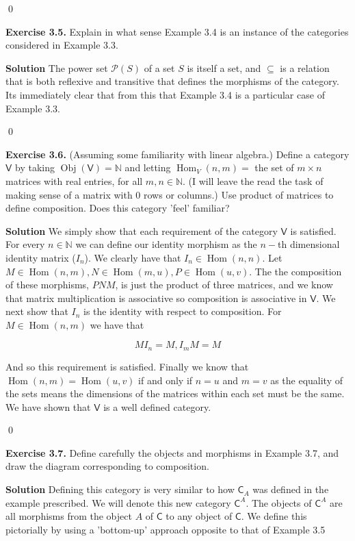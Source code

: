 \documentclass[titlepage]{article}
\newcommand{\Exercise}[1]{\textbf{Exercise #1}}
\newcommand{\Solution}{\textbf{Solution }}
\newcommand{\cat}[1]{\mathsf{#1}}
\newcommand{\Cat}{\cat{C}}
\DeclareMathOperator{\Hom}{Hom}
\DeclareMathOperator{\Obj}{Obj}
\begin{document}
\qed

\Exercise{3.5.} Explain in what sense Example 3.4 is an instance of the categories considered in Example 3.3.

\Solution The power set $\mathscr{P}(S)$ of a set $S$ is itself a set, and $\subseteq$ is a relation that is both reflexive and transitive that defines the morphisms of the category. Its immediately clear that from this that Example 3.4 is a particular case of Example 3.3. 

\qed

\Exercise{3.6.} (Assuming some familiarity with linear algebra.) Define a category $\cat{V}$ by taking $\Obj(\cat{V}) = \mathbb{N}$ and letting $\Hom_V(n,m) = $ the set of $m \times n$ matrices with real entries, for all $m,n \in \mathbb{N}$. (I will leave the read the task of making sense of a matrix with 0 rows or columns.) Use product of matrices to define composition. Does this category 'feel' familiar?

\Solution We simply show that each requirement of the category $\cat{V}$ is satisfied. For every $n \in \mathbb{N}$ we can define our identity morphism as the $n-$th dimensional identity matrix ($I_n$). We clearly have that $I_n \in \Hom(n,n)$. Let $M \in \Hom(n,m), N \in \Hom(m,u), P \in \Hom(u,v)$. The the composition of these morphisms, $PNM$, is just the product of three matrices, and we know that matrix multiplication is associative so composition is associative in $\cat{V}$. We next show that $I_n$ is the identity with respect to composition. For $M \in \Hom(n,m)$ we have that

\[ M I_n = M, I_m M = M \]

And so this requirement is satisfied. Finally we know that $\Hom(n,m) = \Hom(u,v)$ if and only if $n=u$ and $m=v$ as the equality of the sets means the dimensions of the matrices within each set must be the same. We have shown that $\cat{V}$ is a well defined category.

\qed

\Exercise{3.7.} Define carefully the objects and morphisms in Example 3.7, and draw the diagram corresponding to composition.

\medskip

\Solution Defining this category is very similar to how $\Cat_A$ was defined in the example prescribed. We will denote this new category $\Cat^A$. The objects of $\Cat^A$ are all morphisms from the object $A$ of $\Cat$ to any object of $\Cat$. We define this pictorially by using a 'bottom-up' approach opposite to that of Example 3.5
\end{document}
